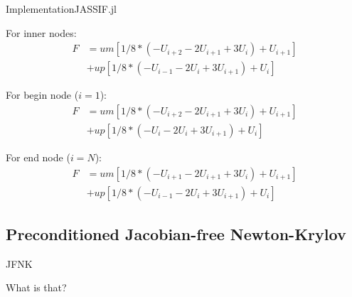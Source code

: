 \documentclass[aspectratio=169, sectionpages, codemintedoverleaf, bibref]{beamer}
\begin{document}
\begin{frame}{Implementation}{JASSIF.jl}

	For inner nodes:
    \begin{equation}
        \begin{split}
            F &= um \left[ 1/8 * \left( -U_{i+2} - 2 U_{i+1} + 3 U_{i} \right) + U_{i+1} \right] \\
            &+ up \left[ 1/8 * \left( -U_{i-1} - 2 U_{i} + 3 U_{i+1} \right) + U_{i} \right]
        \end{split}
	\end{equation}

    For begin node ($i=1$):
    \begin{equation}
        \begin{split}
            F &= um \left[ 1/8 * \left( -U_{i+2} - 2 U_{i+1} + 3 U_{i} \right) + U_{i+1} \right] \\
            &+ up \left[ 1/8 * \left( -U_{i} - 2 U_{i} + 3 U_{i+1} \right) + U_{i} \right]
        \end{split}
	\end{equation}

    For end node ($i=N$):
    \begin{equation}
        \begin{split}
            F &= um \left[ 1/8 * \left( -U_{i+1} - 2 U_{i+1} + 3 U_{i} \right) + U_{i+1} \right] \\
            &+ up \left[ 1/8 * \left( -U_{i-1} - 2 U_{i} + 3 U_{i+1} \right) + U_{i} \right]
        \end{split}
	\end{equation}
        
\end{frame}

\subsection{Preconditioned Jacobian-free Newton-Krylov}
\begin{frame}[c]{JFNK}
    \begin{center}
        \Large{What is that?}
    \end{center}
\end{frame}
\end{document}
